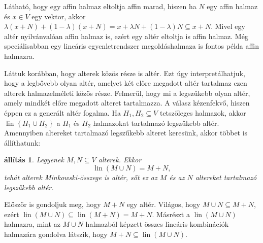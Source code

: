 \documentclass[9pt, a4paper, showtrims]{memoir}
\makeatletter
\renewenvironment{proof}[1][\proofname]
    {\par\pushQED{\qed}%
    \normalfont \topsep6\p@\@plus6\p@\relax
    \trivlist
    \item[\hskip\labelsep
        \itshape
    #1\@addpunct{:}]\ignorespaces}
    {\popQED\endtrivlist\@endpefalse}
\theoremstyle{plain}
\newtheorem{proposition}{állítás}[chapter]
\theoremstyle{remark}
\theoremstyle{definition}
\DeclareMathOperator{\lin}{lin}
\makeatother
\begin{document}
Látható, hogy egy affin halmaz eltoltja affin marad,
hiszen ha
$N$ egy affin halmaz és $x\in V$ egy vektor,
akkor
$
	\lambda\left( x+N \right)+\left( 1-\lambda \right)\left( x+N \right)
	=
	x+\lambda N+\left( 1-\lambda \right)N
	\subseteq
	x+N
$.
Mivel egy altér nyilvánvalóan affin halmaz is,
ezért egy altér eltoltja is affin halmaz.
Még speciálisabban egy lineáris egyenletrendszer megoldáshalmaza is fontos példa affin halmazra.

Láttuk korábban, hogy alterek közös része is altér.
Ezt úgy interpretálhatjuk, hogy a legbővebb olyan altér,
amelyet két előre megadott altér tartalmaz ezen alterek halmazelméleti közös része.
Felmerül, hogy mi a legszűkebb olyan altér, amely mindkét előre megadott alteret tartalmazza.
A válasz kézenfekvő, hiszen éppen ez a generált altér fogalma.
Ha $H_1,H_2\subseteq V$ tetszőleges halmazok, akkor
$\lin\left\{ H_1\cup H_2 \right\}$ a $H_1$ és $H_2$ halmazokat tartalmazó legszűkebb altér.
Amennyiben altereket tartalmazó legszűkebb alteret keresünk,
akkor többet is állíthatunk:
\begin{proposition}
	Legyenek $M,N\subseteq V$ alterek.
	Ekkor
    \[
	    \lin(M\cup N)=M+N,
    \]
	tehát alterek Minkowski-összege is altér, 
    sőt ez az $M$ és az $N$ altereket tartalmazó legszűkebb altér.
\end{proposition}
\begin{proof}
    Először is gondoljuk meg, hogy $M+N$ egy altér.
    Világos, hogy $M\cup N\subseteq M+N$,
    ezért $\lin\left( M\cup N \right)\subseteq \lin\left( M+N \right)=M+N$.
    Másrészt a $\lin\left( M\cup N \right)$ halmazra, 
    mint az $M\cup N$ halmazból képzett összes lineáris kombinációk halmazára gondolva
    látszik, hogy $M+N\subseteq \lin\left( M\cup N \right)$.
\end{proof}
\end{document}
